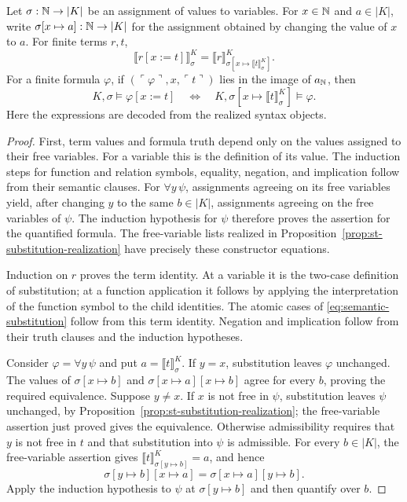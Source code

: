 \begin{lemma}\label{lem:semantic-substitution}
Let $\sigma:\mathbb N\to |K|$ be an assignment of values to variables.
For $x\in\mathbb N$ and $a\in|K|$, write
$\sigma[x\mapsto a]:\mathbb N\to|K|$ for the assignment obtained
by changing the value of $x$ to $a$. For finite terms $r,t$,
\[
 \llbracket r[x:=t]\rrbracket^K_\sigma
 =\llbracket r\rrbracket^K_{
          \sigma[x\mapsto\llbracket t\rrbracket^K_\sigma]}.
\]
For a finite formula $\varphi$, if
$(\ulcorner\varphi\urcorner,x,\ulcorner t\urcorner)$ lies in
the image of $a_{\mathbb N}$, then
\begin{equation}\label{eq:semantic-substitution}
 K,\sigma\models\varphi[x:=t]
 \quad\Longleftrightarrow\quad
 K,\sigma[x\mapsto\llbracket t\rrbracket^K_\sigma]
             \models\varphi.
\end{equation}
Here the expressions are decoded from the realized syntax objects.
\end{lemma}
\begin{proof}
First, term values and formula truth depend only on the values
assigned to their free variables. For a variable this is the
definition of its value. The induction steps for function and
relation symbols, equality, negation, and implication follow from
their semantic clauses. For $\forall y\,\psi$, assignments agreeing
on its free variables yield, after changing $y$ to the same
$b\in|K|$, assignments agreeing on the free variables of $\psi$.
The induction hypothesis for $\psi$ therefore proves the assertion
for the quantified formula. The free-variable lists realized in
Proposition~\ref{prop:st-substitution-realization} have precisely
these constructor equations.

Induction on $r$ proves the term identity. At a variable it is the
two-case definition of substitution; at a function application it
follows by applying the interpretation of the function symbol to
the child identities. The atomic cases of
\eqref{eq:semantic-substitution} follow from this term identity.
Negation and implication follow from their truth clauses and the
induction hypotheses.

Consider $\varphi=\forall y\,\psi$ and put
$a=\llbracket t\rrbracket^K_\sigma$. If $y=x$, substitution leaves
$\varphi$ unchanged. The values of
$\sigma[x\mapsto b]$ and
$\sigma[x\mapsto a][x\mapsto b]$ agree for every $b$, proving
the required equivalence. Suppose $y\ne x$. If $x$ is not free
in $\psi$, substitution leaves $\psi$ unchanged, by
Proposition~\ref{prop:st-substitution-realization}; the free-variable
assertion just proved gives the equivalence. Otherwise admissibility
requires that $y$ is not free in $t$ and that substitution into
$\psi$ is admissible. For every $b\in|K|$, the free-variable
assertion gives
$\llbracket t\rrbracket^K_{\sigma[y\mapsto b]}=a$, and hence
\[
 \sigma[y\mapsto b][x\mapsto a]
   =\sigma[x\mapsto a][y\mapsto b].
\]
Apply the induction hypothesis to $\psi$ at
$\sigma[y\mapsto b]$ and then quantify over $b$.
\end{proof}

